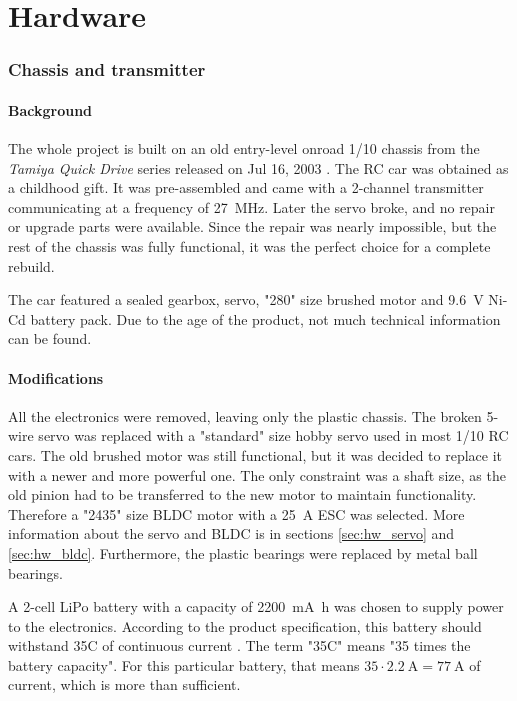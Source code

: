 


\part{Hardware}
\label{chap:hw}


\section{Chassis and transmitter}
\label{sec:hw_base}
\subsection{Background}
The whole project is built on an old entry-level onroad 1/10 chassis from the \textit{Tamiya Quick Drive} series released on Jul 16, 2003 \cite{tamiya}. The RC car was obtained as a childhood gift. It was pre-assembled and came with a 2-channel transmitter communicating at a frequency of \SI{27}{\MHz}. Later the servo broke, and no repair or upgrade parts were available. Since the repair was nearly impossible, but the rest of the chassis was fully functional, it was the perfect choice for a complete rebuild.

The car featured a sealed gearbox, servo, "280" size brushed motor and \SI{9.6}{\V} Ni-Cd battery pack. Due to the age of the product, not much technical information can be found.

\subsection{Modifications}
\label{sec:hw_mods}
All the electronics were removed, leaving only the plastic chassis. The broken 5-wire servo was replaced with a "standard" size hobby servo used in most 1/10 RC cars. The old brushed motor was still functional, but it was decided to replace it with a newer and more powerful one. The only constraint was a shaft size, as the old pinion had to be transferred to the new motor to maintain functionality. Therefore a "2435" size BLDC motor with a \SI{25}{\A} ESC was selected. More information about the servo and BLDC is in sections \ref{sec:hw_servo} and \ref{sec:hw_bldc}. Furthermore, the plastic bearings were replaced by metal ball bearings.

A 2-cell LiPo battery with a capacity of \SI{2200}{\milli\A\hour} was chosen to supply power to the electronics. According to the product specification, this battery should withstand 35C of continuous current \cite{lipo_car}. The term "35C" means "35 times the battery capacity". For this particular battery, that means $35 \cdot \SI{2.2}{\A} = \SI{77}{\A}$ of current, which is more than sufficient.

